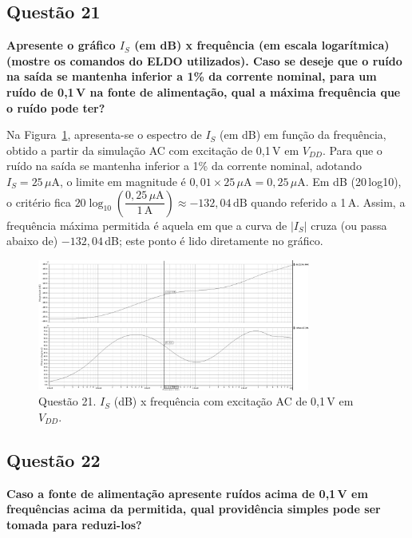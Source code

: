 \documentclass[12pt,a4paper]{article}
\begin{document}
\subsection*{Questão 21}
\begin{BoxQ}
	\textbf{Apresente o gráfico $I_{S}$ (em dB) x frequência (em escala logarítmica) (mostre os comandos do ELDO utilizados). Caso se deseje que o ruído na saída se mantenha inferior a 1\% da corrente nominal, para um ruído de 0,1\,V na fonte de alimentação, qual a máxima frequência que o ruído pode ter?}
\end{BoxQ}

Na Figura~\ref{fig:q21_is_db}, apresenta-se o espectro de $I_S$ (em dB) em função da frequência, obtido a partir da simulação AC com excitação de 0,1\,V em $V_{DD}$. Para que o ruído na saída se mantenha inferior a 1\% da corrente nominal, adotando $I_S=25\,\mu$A, o limite em magnitude é $0{,}01\times 25\,\mu\text{A}=0{,}25\,\mu\text{A}$. Em dB (20\,log10), o critério fica $20\log_{10}\!\left(\dfrac{0{,}25\,\mu\text{A}}{1\,\text{A}}\right)\approx -132{,}04\,\text{dB}$ quando referido a 1\,A. Assim, a frequência máxima permitida é aquela em que a curva de $|I_S|$ cruza (ou passa abaixo de) $-132{,}04$\,dB; este ponto é lido diretamente no gráfico.

\begin{figure}[H]
    \centering
    \includegraphics[width=0.8\textwidth]{images/21.png}
    \caption{Questão 21. $I_S$ (dB) x frequência com excitação AC de 0,1\,V em $V_{DD}$. }
    \label{fig:q21_is_db}
\end{figure}

\subsection*{Questão 22}
\begin{BoxQ}
	\textbf{Caso a fonte de alimentação apresente ruídos acima de 0,1\,V em frequências acima da permitida, qual providência simples pode ser tomada para reduzi-los?}
\end{BoxQ}
\end{document}
